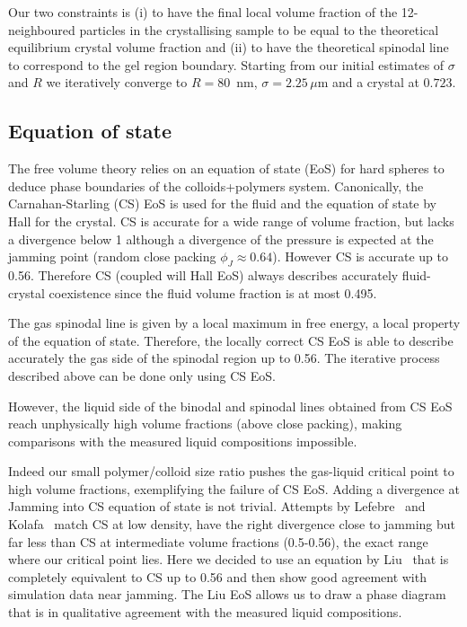 Our two constraints is (i) to have the final local volume fraction of the 12-neighboured particles in the crystallising sample to be equal to the theoretical equilibrium crystal volume fraction and (ii) to have the theoretical spinodal line to correspond to the gel region boundary. Starting from our initial estimates of $\sigma$ and $R$ we iteratively converge to $R=80$~nm, $\sigma = 2.25\,\mu$m and a crystal at $0.723$.

\subsection*{Equation of state}

The free volume theory relies on an equation of state (EoS) for hard spheres to deduce phase boundaries of the colloids+polymers system. Canonically, the Carnahan-Starling (CS) EoS is used for the fluid and the equation of state by Hall for the crystal. CS is accurate for a wide range of volume fraction, but lacks a divergence below 1 although a divergence of the pressure is expected at the jamming point (random close packing $\phi_J\approx 0.64$). However CS is accurate up to 0.56. Therefore CS (coupled will Hall EoS) always describes accurately fluid-crystal coexistence since the fluid volume fraction is at most 0.495.

The gas spinodal line is given by a local maximum in free energy, a local property of the equation of state. Therefore, the locally correct CS EoS is able to describe accurately the gas side of the spinodal region up to 0.56. The iterative process described above can be done only using CS EoS.

However, the liquid side of the binodal and spinodal lines obtained from CS EoS reach unphysically high volume fractions (above close packing), making comparisons with the measured liquid compositions impossible.

Indeed our small polymer/colloid size ratio pushes the gas-liquid critical point to high volume fractions, exemplifying the failure of CS EoS. Adding a divergence at Jamming into CS equation of state is not trivial. Attempts by Lefebre~\cite{LeFevre1972} and Kolafa~\cite{Kolafa2004} match CS at low density, have the right divergence close to jamming but far less than CS at intermediate volume fractions (0.5-0.56), the exact range where our critical point lies. Here we decided to use an equation by Liu~\cite{Liu2006a} that is completely equivalent to CS up to 0.56 and then show good agreement with simulation data near jamming.
%
The Liu EoS allows us to draw a phase diagram that is in qualitative agreement with the measured liquid compositions.

